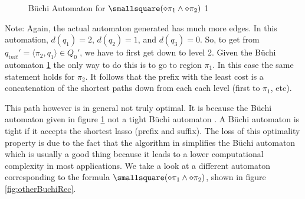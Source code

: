 \begin{figure}
\centering
{}
\caption{B\"uchi Automaton for $\smallsquare(\diamond \pi_1 \land \diamond \pi_2 )$ 1}
\label{fig:gasBuchiRec}
\end{figure}
Note: Again, the actual automaton generated has much more edges. %
In this automation, $d(q_1)=2$, $d(q_2)=1$, and $d(q_3)=0$. So, to get from $q_{init}' = \langle \pi_2, q_1 \rangle \in Q_0'$, we have to first get down to level 2. Given the B\"{u}chi automaton \ref{fig:gasBuchiRec} the only way to do this is to go to region $\pi_1$.  In this case the same statement holds for $\pi_2$. It follows that the prefix with the least cost is a concatenation of the shortest paths down from each each level (first to $\pi_1$, etc).


This path however is in general not truly optimal. It is because the B\"{u}chi automaton given in figure \ref{fig:gasBuchiRec} not a tight B\"{u}chi automaton \cite{schuppan05}. A B\"{u}chi automaton is tight if it accepts the shortest lasso (prefix and suffix). The loss of this optimality property is due to the fact that the algorithm in \cite{gastin01} simplifies the B\"{u}chi automaton which is usually a good thing because it leads to a lower computational complexity in most applications. We take a look at a different automaton corresponding to the formula $\smallsquare(\diamond \pi_1 \land \diamond \pi_2)$, shown in figure \ref{fig:otherBuchiRec}. 

